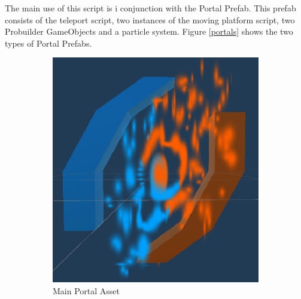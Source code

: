 \noindent The main use of this script is i conjunction with the Portal Prefab. This prefab consists of the teleport script, two instances of the moving platform script, two Probuilder GameObjects and a particle system. Figure \ref{portals} shows the two types of Portal Prefabs.

\begin{figure}[H]
\centering
\begin{subfigure}{0.4\textwidth}
  \centering
  \includegraphics[width=1\linewidth]{Figures/finporta.png}
  \caption{Main Portal Asset}
\end{subfigure}%
\begin{subfigure}{0.4\textwidth}
  \centering

\end{subfigure}
\end{figure}
